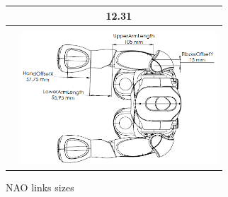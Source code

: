 \begin{figure}[t!]
\begin{tabularx}{\textwidth}{cc}
\begin{tabular}{|l|l|}
{HandOffsetZ} & 12.31 \\ \hline
\end{tabular}
\\
&
\includegraphics[height = 5cm]{Figures/naolinks_2.png}
\\
\end{tabularx}
\caption{NAO links sizes}
\label{fig:NAOlinks}
\end{figure}


